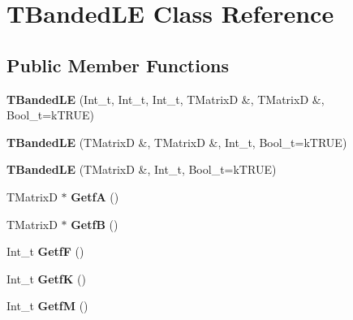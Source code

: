 \hypertarget{classTBandedLE}{\section{T\-Banded\-L\-E Class Reference}
\label{classTBandedLE}
}
\subsection*{Public Member Functions}
\begin{DoxyCompactItemize}
\item 
\hypertarget{classTBandedLE_aa14ae5ca290e2c7512dd2346b6b0f82b}{{\bfseries T\-Banded\-L\-E} (Int\-\_\-t, Int\-\_\-t, Int\-\_\-t, T\-Matrix\-D \&, T\-Matrix\-D \&, Bool\-\_\-t=k\-T\-R\-U\-E)}\label{classTBandedLE_aa14ae5ca290e2c7512dd2346b6b0f82b}

\item 
\hypertarget{classTBandedLE_a62d58cca8eabaf62313b47ff0c9d3c82}{{\bfseries T\-Banded\-L\-E} (T\-Matrix\-D \&, T\-Matrix\-D \&, Int\-\_\-t, Bool\-\_\-t=k\-T\-R\-U\-E)}\label{classTBandedLE_a62d58cca8eabaf62313b47ff0c9d3c82}

\item 
\hypertarget{classTBandedLE_a7de8222c8c49c6de6aac0b127c467c42}{{\bfseries T\-Banded\-L\-E} (T\-Matrix\-D \&, Int\-\_\-t, Bool\-\_\-t=k\-T\-R\-U\-E)}\label{classTBandedLE_a7de8222c8c49c6de6aac0b127c467c42}

\item 
\hypertarget{classTBandedLE_a3db0645bedc75741b01308191777d2b1}{T\-Matrix\-D $\ast$ {\bfseries Getf\-A} ()}\label{classTBandedLE_a3db0645bedc75741b01308191777d2b1}

\item 
\hypertarget{classTBandedLE_a2cc97bfdf9f195abef626170383fd14c}{T\-Matrix\-D $\ast$ {\bfseries Getf\-B} ()}\label{classTBandedLE_a2cc97bfdf9f195abef626170383fd14c}

\item 
\hypertarget{classTBandedLE_a020a24f63feaf81164cb131c974706bf}{Int\-\_\-t {\bfseries Getf\-F} ()}\label{classTBandedLE_a020a24f63feaf81164cb131c974706bf}

\item 
\hypertarget{classTBandedLE_a8d9b1457a47e508d0986a40f7d0dd3ef}{Int\-\_\-t {\bfseries Getf\-K} ()}\label{classTBandedLE_a8d9b1457a47e508d0986a40f7d0dd3ef}

\item 
\hypertarget{classTBandedLE_abafb965cc802c0675fa5d692bee1b7e6}{Int\-\_\-t {\bfseries Getf\-M} ()}\label{classTBandedLE_abafb965cc802c0675fa5d692bee1b7e6}


\end{DoxyCompactItemize}
